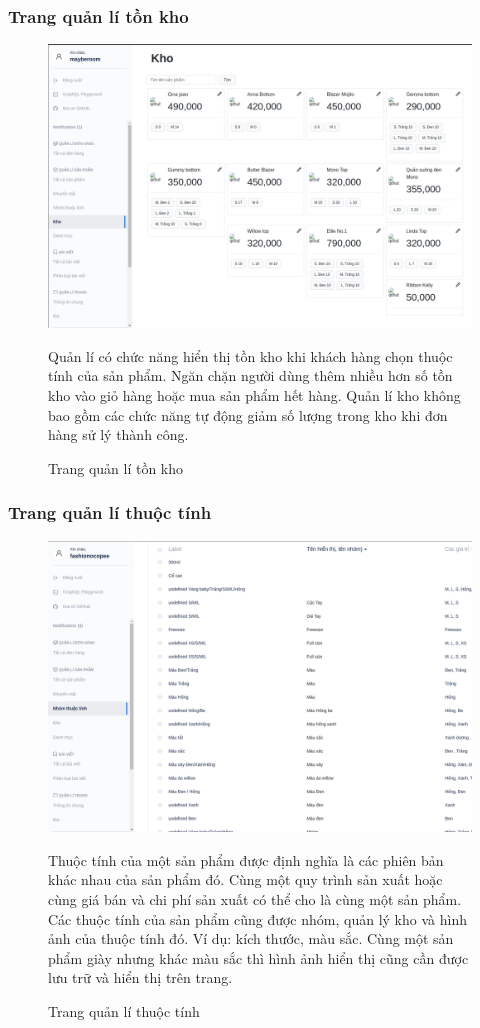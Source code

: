 \subsubsection{Trang quản lí tồn kho}
\FloatBarrier
\begin{figure}[!htbp]\fontsize{13px}{13px}\selectfont
	\centering
		\includegraphics[width=\textwidth]{./results/stock}
		\caption{Trang quản lí tồn kho}
	\justifying
Quản lí có chức năng hiển thị tồn kho khi khách hàng chọn thuộc tính của sản phẩm. Ngăn chặn người dùng thêm nhiều hơn số tồn kho vào giỏ hàng hoặc mua sản phẩm hết hàng. Quản lí kho không bao gồm các chức năng tự động giảm số lượng trong kho khi đơn hàng sử lý thành công.
\end{figure}
\clearpage
\subsubsection{Trang quản lí thuộc tính}
\FloatBarrier
\begin{figure}[!htbp]\fontsize{13px}{13px}\selectfont
\centering
		\includegraphics[width=\textwidth]{./results/attributes}
		\caption{Trang quản lí thuộc tính}
\justifying
Thuộc tính của một sản phẩm được định nghĩa là các phiên bản khác nhau của sản phẩm đó. Cùng một quy trình sản xuất hoặc cùng giá bán và chi phí sản xuất có thể cho là cùng một sản phẩm. Các thuộc tính của sản phẩm cũng được nhóm, quản lý kho và hình ảnh của thuộc tính đó. Ví dụ: kích thước, màu sắc. Cùng một sản phẩm giày nhưng khác màu sắc thì hình ảnh hiển thị cũng cần được lưu trữ và hiển thị trên trang.
\end{figure}
\clearpage

